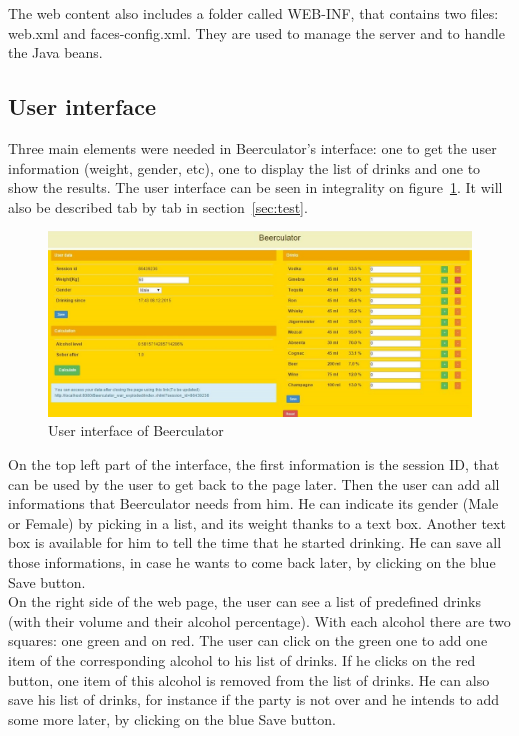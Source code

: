 The web content also includes a folder called WEB-INF, that contains two files: web.xml and faces-config.xml. They are used to manage the server and to handle the Java beans.

\subsection{User interface}
\label{ssec:ui}

Three main elements were needed in Beerculator's interface: one to get the user information (weight, gender, etc), one to display the list of drinks and one to show the results. The user interface can be seen in integrality on {\sc figure}~\ref{fig:ui}. It will also be described tab by tab in {\sc section}~\ref{sec:test}.\\

\begin{figure}[H]
\centering
   \includegraphics[scale=0.6]{./figures/ui.jpg}
   \caption{User interface of Beerculator}
   \label{fig:ui}
\end{figure}

On the top left part of the interface, the first information is the session ID, that can be used by the user to get back to the page later. Then the user can add all informations that Beerculator needs from him. He can indicate its gender (Male or Female) by picking in a list, and its weight thanks to a text box. Another text box is available for him to tell the time that he started drinking. He can save all those informations, in case he wants to come back later, by clicking on the blue \guillemotleft{} Save \guillemotright{} button.\\

On the right side of the web page, the user can see a list of predefined drinks (with their volume and their alcohol percentage). With each alcohol there are two squares: one green and on red. The user can click on the green one to add one item of the corresponding alcohol to his list of drinks. If he clicks on the red button, one item of this alcohol is removed from the list of drinks. He can also save his list of drinks, for instance if the party is not over and he intends to add some more later, by clicking on the blue \guillemotleft{} Save \guillemotright{} button.\\

